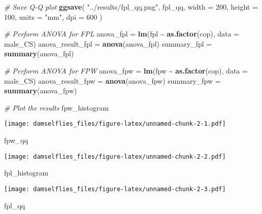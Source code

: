 \documentclass[
]{article}
\newenvironment{Shaded}{\begin{snugshade}}{\end{snugshade}}
\newcommand{\AttributeTok}[1]{\textcolor[rgb]{0.13,0.29,0.53}{#1}}
\newcommand{\CommentTok}[1]{\textcolor[rgb]{0.56,0.35,0.01}{\textit{#1}}}
\newcommand{\DecValTok}[1]{\textcolor[rgb]{0.00,0.00,0.81}{#1}}
\newcommand{\FunctionTok}[1]{\textcolor[rgb]{0.13,0.29,0.53}{\textbf{#1}}}
\newcommand{\NormalTok}[1]{#1}
\newcommand{\OtherTok}[1]{\textcolor[rgb]{0.56,0.35,0.01}{#1}}
\newcommand{\SpecialCharTok}[1]{\textcolor[rgb]{0.81,0.36,0.00}{\textbf{#1}}}
\newcommand{\StringTok}[1]{\textcolor[rgb]{0.31,0.60,0.02}{#1}}
\begin{document}
\begin{Shaded}
\begin{Highlighting}[]
\CommentTok{\# Save Q{-}Q plot}
\FunctionTok{ggsave}\NormalTok{(}
  \StringTok{"../results/fpl\_qq.png"}\NormalTok{,}
\NormalTok{  fpl\_qq,}
  \AttributeTok{width =} \DecValTok{200}\NormalTok{,}
  \AttributeTok{height =} \DecValTok{100}\NormalTok{,}
  \AttributeTok{units =} \StringTok{"mm"}\NormalTok{,}
  \AttributeTok{dpi =} \DecValTok{600}
\NormalTok{)}

\CommentTok{\# Perform ANOVA for FPL}
\NormalTok{anova\_fpl }\OtherTok{=} \FunctionTok{lm}\NormalTok{(fpl }\SpecialCharTok{\textasciitilde{}} \FunctionTok{as.factor}\NormalTok{(cop), }\AttributeTok{data =}\NormalTok{ male\_CS)}
\NormalTok{anova\_result\_fpl }\OtherTok{=} \FunctionTok{anova}\NormalTok{(anova\_fpl)}
\NormalTok{summary\_fpl }\OtherTok{=} \FunctionTok{summary}\NormalTok{(anova\_fpl)}

\CommentTok{\# Perform ANOVA for FPW}
\NormalTok{anova\_fpw }\OtherTok{=} \FunctionTok{lm}\NormalTok{(fpw }\SpecialCharTok{\textasciitilde{}} \FunctionTok{as.factor}\NormalTok{(cop), }\AttributeTok{data =}\NormalTok{ male\_CS)}
\NormalTok{anova\_result\_fpw }\OtherTok{=} \FunctionTok{anova}\NormalTok{(anova\_fpw)}
\NormalTok{summary\_fpw }\OtherTok{=} \FunctionTok{summary}\NormalTok{(anova\_fpw)}

\CommentTok{\# Plot the results}
\NormalTok{fpw\_histogram}
\end{Highlighting}
\end{Shaded}

\texttt{[image: damselflies\_files/figure-latex/unnamed-chunk-2-1.pdf]}

\begin{Shaded}
\begin{Highlighting}[]
\NormalTok{fpw\_qq}
\end{Highlighting}
\end{Shaded}

\texttt{[image: damselflies\_files/figure-latex/unnamed-chunk-2-2.pdf]}

\begin{Shaded}
\begin{Highlighting}[]
\NormalTok{fpl\_histogram}
\end{Highlighting}
\end{Shaded}

\texttt{[image: damselflies\_files/figure-latex/unnamed-chunk-2-3.pdf]}

\begin{Shaded}
\begin{Highlighting}[]
\NormalTok{fpl\_qq}
\end{Highlighting}
\end{Shaded}
\end{document}
